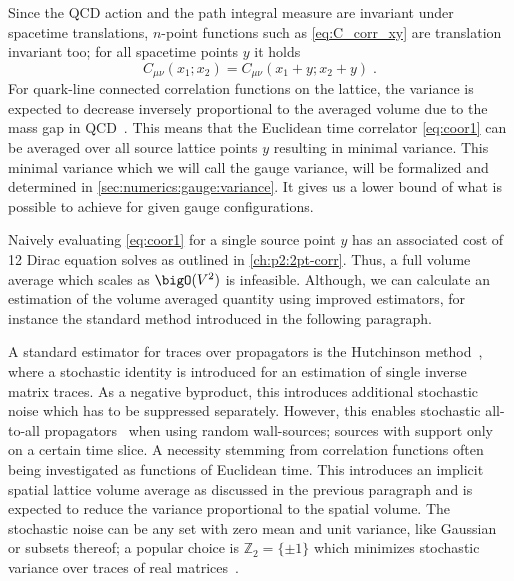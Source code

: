 Since the QCD action and the path integral measure are invariant under spacetime translations, $n$-point functions such as \cref{eq:C_corr_xy} are translation invariant too; for all spacetime points $y$ it holds
\begin{equation} \label{eq:translation:average}
C_{\mu \nu}(x_1; x_2) = C_{\mu \nu}(x_1 + y; x_2 + y) \;.
\end{equation}
For quark-line connected correlation functions on the lattice, the variance is expected to decrease inversely proportional to the averaged volume due to the mass gap in QCD~\cite{Luscher:2017cjh}.
This means that the Euclidean time correlator \cref{eq:coor1} can be averaged over all source lattice points $y$ resulting in minimal variance.
This minimal variance which we will call the gauge variance, will be formalized and determined in \cref{sec:numerics:gauge:variance}.
It gives us a lower bound of what is possible to achieve for given gauge configurations.

Naively evaluating \cref{eq:coor1} for a single source point $y$ has an associated cost of \num{12} Dirac equation solves as outlined in \cref{ch:p2:2pt-corr}.
Thus, a full volume average which scales as $\bigO(V^{2})$ is infeasible.
Although, we can calculate an estimation of the volume averaged quantity using improved estimators, for instance the standard method introduced in the following paragraph.


A standard estimator for traces  over propagators is the Hutchinson method~\cite{Hutchinson01011990}, where a stochastic identity is introduced for an estimation of single inverse matrix traces.
As a negative byproduct, this introduces additional stochastic noise which has to be suppressed separately.
However, this enables stochastic all-to-all propagators~\cite{Foley:2005ac} when using random wall-sources; sources with support only on a certain time slice.
A necessity stemming from correlation functions often being investigated as functions of Euclidean time.
This introduces an implicit spatial lattice volume average as discussed in the previous paragraph and is expected to reduce the variance proportional to the spatial volume.
The stochastic noise can be any set with zero mean and unit variance, like Gaussian or subsets thereof; a popular choice is $\mathbb{Z}_2 = \{\pm 1\}$ which minimizes stochastic variance over traces of real matrices~\cite{Bernardson:1993he}.

